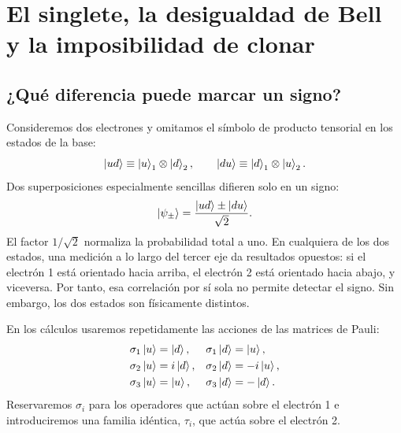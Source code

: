\chapter{El singlete, la desigualdad de Bell y la imposibilidad de clonar}


\section{¿Qué diferencia puede marcar un signo?}

Consideremos dos electrones y omitamos el símbolo de producto tensorial en los estados de la base:
\begin{equation}
  \left\lvert ud\right\rangle\equiv\left\lvert u\right\rangle_1\otimes\left\lvert d\right\rangle_2,
  \qquad
  \left\lvert du\right\rangle\equiv\left\lvert d\right\rangle_1\otimes\left\lvert u\right\rangle_2.
\end{equation}
Dos superposiciones especialmente sencillas difieren solo en un signo:
\begin{equation}
  \left\lvert\psi_\pm\right\rangle
  =
  \frac{\left\lvert ud\right\rangle\pm\left\lvert du\right\rangle}{\sqrt2}.
  \label{eq:l05-two-signs}
\end{equation}
El factor \(1/\sqrt2\) normaliza la probabilidad total a uno. En cualquiera de los dos estados, una medición a lo largo del tercer eje da resultados opuestos: si el electrón 1 está orientado hacia arriba, el electrón 2 está orientado hacia abajo, y viceversa. Por tanto, esa correlación por sí sola no permite detectar el signo. Sin embargo, los dos estados son físicamente distintos.

En los cálculos usaremos repetidamente las acciones de las matrices de Pauli:
\begin{align}
  \sigma_1\left\lvert u\right\rangle&=\left\lvert d\right\rangle,&
  \sigma_1\left\lvert d\right\rangle&=\left\lvert u\right\rangle,\nonumber\\
  \sigma_2\left\lvert u\right\rangle&=i\left\lvert d\right\rangle,&
  \sigma_2\left\lvert d\right\rangle&=-i\left\lvert u\right\rangle,\nonumber\\
  \sigma_3\left\lvert u\right\rangle&=\left\lvert u\right\rangle,&
  \sigma_3\left\lvert d\right\rangle&=-\left\lvert d\right\rangle.
  \label{eq:l05-pauli-actions}
\end{align}
Reservaremos \(\sigma_i\) para los operadores que actúan sobre el electrón 1 e introduciremos una familia idéntica, \(\tau_i\), que actúa sobre el electrón 2.


